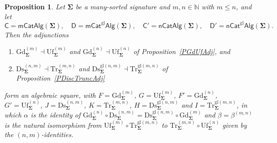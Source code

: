 \documentclass[a4paper, reqno
]{amsart}
\newcommand{\sig}[1]{\mathbf{#1}}             %
\newcommand{\gl}{\mathrm{gl}}                %
\newcommand{\Gd}{\mathrm{Gd}}
\newcommand{\Uf}{\mathrm{Uf}}
\newcommand{\Ds}{\mathrm{Ds}}
\newcommand{\Tr}{\mathrm{Tr}}
\theoremstyle{plain}
\newtheorem{proposition}[theorem]{Proposition}
\theoremstyle{definition}
\begin{document}
\begin{proposition}\label{PAlgSquareFinite}
Let $\sig{\Sigma}$ be a many-sorted signature and $m,n\in\mathbb{N}$ with $m\leq n$, and let
$$
\mathsf{C}=\mathsf{mCatAlg}(\sig{\Sigma}),\quad
\mathsf{D}=\mathsf{mCat}^{\gl}\mathsf{Alg}(\sig{\Sigma}),\quad
\mathsf{C}'=\mathsf{nCatAlg}(\sig{\Sigma}),\quad
\mathsf{D}'=\mathsf{nCat}^{\gl}\mathsf{Alg}(\sig{\Sigma}).
$$
Then the adjunctions
\begin{enumerate}
\item $\Gd^{(m)}_{\sig{\Sigma}}\dashv\Uf^{(m)}_{\sig{\Sigma}}$ and $\Gd^{(n)}_{\sig{\Sigma}}\dashv\Uf^{(n)}_{\sig{\Sigma}}$ of Proposition~\ref{PGdUfAdj}, and
\item $\Ds^{(n,m)}_{\sig{\Sigma}}\dashv \Tr^{(m,n)}_{\sig{\Sigma}}$ and $\Ds^{\gl(n,m)}_{\sig{\Sigma}}\dashv \Tr^{\gl(m,n)}_{\sig{\Sigma}}$ of Proposition~\ref{PDiscTruncAdj}
\end{enumerate}
form an algebraic square, with $F=\Gd^{(m)}_{\sig{\Sigma}}$, $G=\Uf^{(m)}_{\sig{\Sigma}}$, $F'=\Gd^{(n)}_{\sig{\Sigma}}$, $G'=\Uf^{(n)}_{\sig{\Sigma}}$, $J=\Ds^{(n,m)}_{\sig{\Sigma}}$, $K=\Tr^{(m,n)}_{\sig{\Sigma}}$, $H=\Ds^{\gl(n,m)}_{\sig{\Sigma}}$ and $I=\Tr^{\gl(m,n)}_{\sig{\Sigma}}$, in which $\alpha$ is the identity of $\Gd^{(n)}_{\sig{\Sigma}}\circ\Ds^{(n,m)}_{\sig{\Sigma}}=\Ds^{\gl(n,m)}_{\sig{\Sigma}}\circ\Gd^{(m)}_{\sig{\Sigma}}$ and $\beta=\beta^{(m,n)}$ is the natural isomorphism from $\Uf^{(m)}_{\sig{\Sigma}}\circ \Tr^{\gl(m,n)}_{\sig{\Sigma}}$ to $\Tr^{(m,n)}_{\sig{\Sigma}}\circ\Uf^{(n)}_{\sig{\Sigma}}$ given by the $(n,m)$-identities.


\end{proposition}
\end{document}
